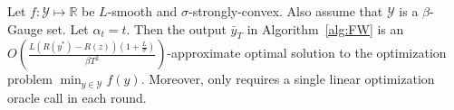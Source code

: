 \documentclass[final,12pt]{colt2018} %
\def\reals{\mathbb{R}}
\def\reals{\mathbb{R}}
\def\argmin{\mathop{\arg\min}}
\def\balpha{\boldsymbol{\alpha}}
\def\BTRL{\textsc{BeTheRegularizedLeader}\xspace}
\def\OFTL{\textsc{Optimistic-FTL}\xspace}
\newcommand{\lr}[2]{\left\langle#1,#2\right\rangle}
\newcommand{\XX}{\mathcal{X}}
\newcommand{\YY}{\mathcal{Y}}
\newcommand{\pr}[1]{\left(#1\right)}
\begin{document}
\begin{corollary}\label{cor:FWcor} \label{thm:FW}
Let $f:\YY \mapsto \reals$ be $L$-smooth and $\sigma$-strongly-convex. Also assume that $\YY$ is a $\beta$-Gauge set. Let $\alpha_t = t$. Then the output $\bar{y}_{T}$ in Algorithm~\ref{alg:FW} is an $O\pr{ \frac{ L ( R(y^*) - R(z) )(1+\frac{L}{\sigma}) }{ \beta  T^2}}$-approximate optimal solution to the optimization problem $\min_{y \in \YY} f(y)$. Moreover,  only requires a single linear optimization oracle call in each round.
\end{corollary}






%

\end{document}
